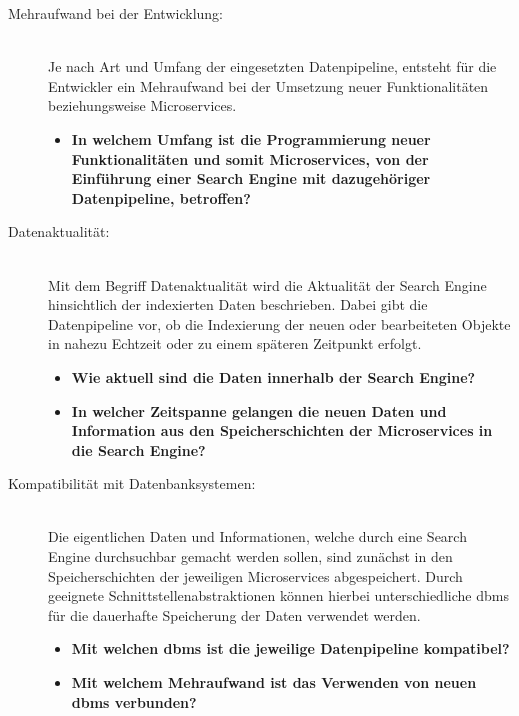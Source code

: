 \begin{description}
    \item[Mehraufwand bei der Entwicklung:]\hfill \\
    Je nach Art und Umfang der eingesetzten Datenpipeline, entsteht für die Entwickler ein Mehraufwand bei der Umsetzung neuer Funktionalitäten beziehungsweise Microservices.
    
    \begin{itemize}
        \item \textbf{In welchem Umfang ist die Programmierung neuer Funktionalitäten und somit Microservices, von der Einführung einer Search Engine mit dazugehöriger Datenpipeline, betroffen?}
    \end{itemize}

    \item[Datenaktualität:]\hfill \\
    Mit dem Begriff \glqq Datenaktualität\grqq{} wird die Aktualität der Search Engine hinsichtlich der indexierten Daten beschrieben. Dabei gibt die Datenpipeline vor, ob die Indexierung der neuen oder bearbeiteten Objekte in nahezu Echtzeit oder zu einem späteren Zeitpunkt erfolgt.

    \begin{itemize}
        \item \textbf{Wie aktuell sind die Daten innerhalb der Search Engine?}
        \item \textbf{In welcher Zeitspanne gelangen die neuen Daten und Information aus den Speicherschichten der Microservices in die Search Engine?}
    \end{itemize}
    
    \item[Kompatibilität mit Datenbanksystemen:]\hfill \\
    Die eigentlichen Daten und Informationen, welche durch eine Search Engine \glqq durchsuchbar\grqq{} gemacht werden sollen, sind zunächst in den Speicherschichten der jeweiligen Microservices abgespeichert. Durch geeignete Schnittstellenabstraktionen können hierbei unterschiedliche \gls{dbms} für die dauerhafte Speicherung der Daten verwendet werden.

    \begin{itemize}
        \item \textbf{Mit welchen \gls{dbms} ist die jeweilige Datenpipeline kompatibel?}
        \item \textbf{Mit welchem Mehraufwand ist das Verwenden von \glqq neuen\grqq{} \gls{dbms} verbunden?}
    \end{itemize}
    

\end{description}
